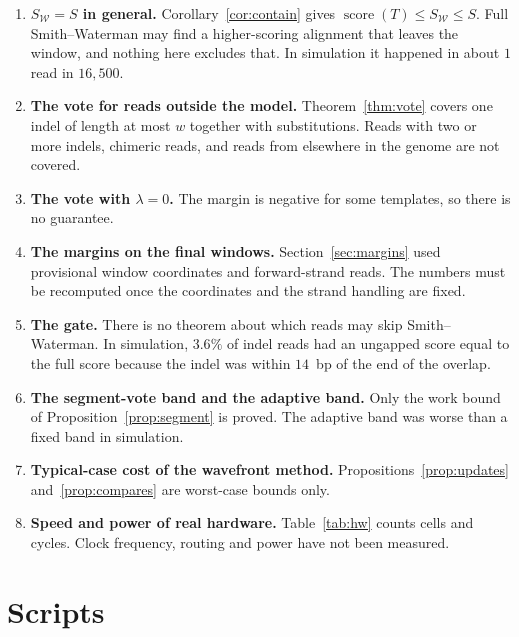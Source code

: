 \documentclass[11pt]{article}
\theoremstyle{plain}
\theoremstyle{definition}
\theoremstyle{remark}
\DeclareMathOperator{\score}{score}
\newcommand{\W}{\mathcal{W}}
\begin{document}
\begin{enumerate}
\item \textbf{$S_{\W} = S$ in general.} Corollary~\ref{cor:contain} gives
      $\score(T) \le S_{\W} \le S$. Full Smith--Waterman may find a
      higher-scoring alignment that leaves the window, and nothing here excludes
      that. In simulation it happened in about $1$ read in $16{,}500$.
\item \textbf{The vote for reads outside the model.} Theorem~\ref{thm:vote}
      covers one indel of length at most $w$ together with substitutions. Reads
      with two or more indels, chimeric reads, and reads from elsewhere in the
      genome are not covered.
\item \textbf{The vote with $\lambda = 0$.} The margin is negative for some
      templates, so there is no guarantee.
\item \textbf{The margins on the final windows.} Section~\ref{sec:margins} used
      provisional window coordinates and forward-strand reads. The numbers must
      be recomputed once the coordinates and the strand handling are fixed.
\item \textbf{The gate.} There is no theorem about which reads may skip
      Smith--Waterman. In simulation, $3.6\%$ of indel reads had an ungapped
      score equal to the full score because the indel was within $14$~bp of the
      end of the overlap.
\item \textbf{The segment-vote band and the adaptive band.} Only the work bound
      of Proposition~\ref{prop:segment} is proved. The adaptive band was worse
      than a fixed band in simulation.
\item \textbf{Typical-case cost of the wavefront method.}
      Propositions~\ref{prop:updates} and~\ref{prop:compares} are worst-case
      bounds only.
\item \textbf{Speed and power of real hardware.} Table~\ref{tab:hw} counts cells
      and cycles. Clock frequency, routing and power have not been measured.
\end{enumerate}

\section*{Scripts}
\end{document}
